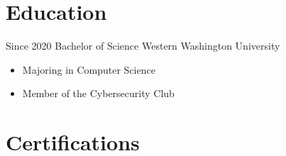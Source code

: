 \documentclass[letterpaper]{twentysecondcv} %
\begin{document}
\makeprofile %





\section{Education}

\begin{twenty} %
	\twentyitem
	{Since 2020}
	{Bachelor of Science}
	{Western Washington University}
	{\begin{itemize}
			\item Majoring in Computer Science
			\item Member of the Cybersecurity Club
		\end{itemize}}
\end{twenty}


\section{Certifications}

\begin{twentyshort} %
\end{twentyshort}
\end{document}
